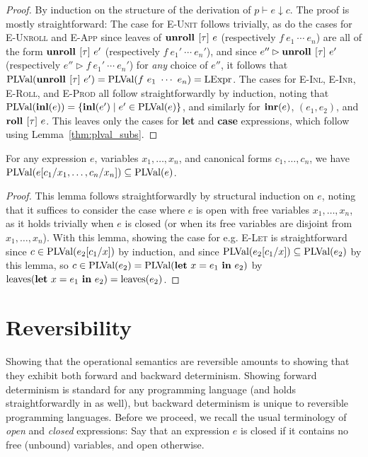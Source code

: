 \begin{proof}

  By induction on the structure of the derivation of $p \vdash e \downarrow c$.
  The proof is mostly straightforward: The case for \textsc{E-Unit} follows
  trivially, as do the cases for \textsc{E-Unroll} and \textsc{E-App} since
  leaves of $\textbf{unroll } [\tau]\ e$ (respectively $f~e_1~\cdots~e_n$) are all of the
  form $\textbf{unroll } [\tau]\ e'$ (respectively $f~e_1'~\cdots~e_n'$), and since $e''
  \rhd \textbf{unroll } [\tau]\ e'$ (respectively $e'' \rhd f~e_1'~\cdots~e_n'$) for
  \emph{any} choice of $e''$, it follows that $\text{PLVal}(\textbf{unroll } [\tau]\ e') =
  \text{PLVal}(f~e_1~\cdots~e_n) = \text{LExpr}$. The cases for \textsc{E-Inl},
  \textsc{E-Inr}, \textsc{E-Roll}, and \textsc{E-Prod} all follow
  straightforwardly by induction, noting that $\text{PLVal}(\textbf{inl}(e)) = \{ \textbf{inl}(e')
  \mid e' \in \text{PLVal}(e) \}$, and similarly for $\textbf{inr}(e)$, $(e_1,e_2)$, and
  $\textbf{roll } [\tau]\ e$. This leaves only the cases for \textbf{let} and
  \textbf{case} expressions, which follow using Lemma~\ref{thm:plval_subs}.

\end{proof}

\begin{lemma}\label{thm:plval_subs}
  For any expression $e$, variables $x_1, \dots, x_n$, and canonical forms
  $c_1, \dots, c_n$, we have $\text{PLVal}(e[c_1/x_1, \dots, c_n/x_n]) \subseteq
  \text{PLVal}(e)$.
\end{lemma}

\begin{proof}

This lemma follows straightforwardly by structural induction on $e$, noting
that it suffices to consider the case where $e$ is open with free variables
$x_1, \dots, x_n$, as it holds trivially when $e$ is closed (or when its free
variables are disjoint from $x_1, \dots, x_n$). With this lemma, showing the
case for e.g. \textsc{E-Let} is straightforward since $c \in
\text{PLVal}(e_2[c_1/x])$ by induction, and since $\text{PLVal}(e_2[c_1/x]) \subseteq
\text{PLVal}(e_2)$ by this lemma, so $c \in \text{PLVal}(e_2) =
\text{PLVal}(\mathbf{let}~x=e_1~\mathbf{in}~e_2)$ by
$\text{leaves}(\mathbf{let}~x=e_1~\mathbf{in}~e_2) = \text{leaves}(e_2)$.

\end{proof}

\section{Reversibility}

Showing that the operational semantics are reversible amounts to showing that
they exhibit both forward and backward determinism. Showing forward
determinism is standard for any programming language (and holds
straightforwardly in \rfunc as well), but backward determinism is unique to
reversible programming languages. Before we proceed, we recall the usual
terminology of \emph{open} and \emph{closed} expressions: Say that an
expression $e$ is closed if it contains no free (unbound) variables, and open
otherwise.

